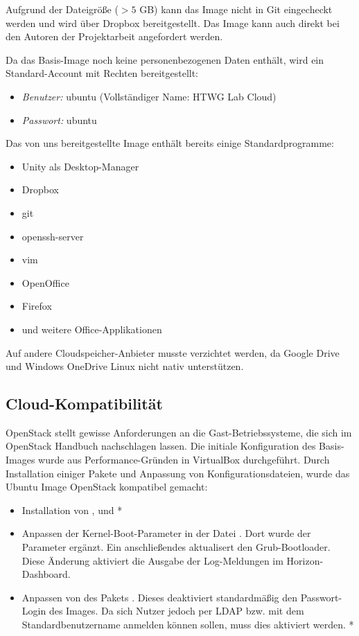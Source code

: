 Aufgrund der Dateigröße ($> 5$ GB) kann das Image nicht in Git eingecheckt werden und wird über Dropbox \cite{dropboxImage} bereitgestellt. Das Image kann auch direkt bei den Autoren der Projektarbeit angefordert werden.

Da das Basis-Image noch keine personenbezogenen Daten enthält, wird ein Standard-Account mit  Rechten bereitgestellt:

\begin{itemize}
\item \emph{Benutzer:} ubuntu (Vollständiger Name: HTWG Lab Cloud)
\item \emph{Passwort:} ubuntu
\end{itemize}

Das von uns bereitgestellte Image enthält bereits einige Standardprogramme:

\begin{itemize}
\item Unity als Desktop-Manager
\item Dropbox
\item git
\item openssh-server
\item vim
\item OpenOffice
\item Firefox
\item und weitere Office-Applikationen
\end{itemize}

Auf andere Cloudspeicher-Anbieter musste verzichtet werden, da Google Drive und Windows OneDrive Linux nicht nativ unterstützen.

\subsection{Cloud-Kompatibilität}

OpenStack stellt gewisse Anforderungen an die Gast-Betriebssysteme, die sich im OpenStack Handbuch \cite{osImageRequirement} nachschlagen lassen. 
Die initiale Konfiguration des Basis-Images wurde aus Performance-Gründen in VirtualBox durchgeführt.
Durch Installation einiger Pakete und Anpassung von Konfigurationsdateien, wurde das Ubuntu Image OpenStack kompatibel gemacht:

\begin{itemize}
\item Installation von ,  und  *
\item Anpassen der Kernel-Boot-Parameter in der Datei . Dort wurde der Parameter  ergänzt. Ein anschließendes  aktualisert den Grub-Bootloader. Diese Änderung aktiviert die Ausgabe der Log-Meldungen im Horizon-Dashboard.
\item Anpassen von  des Pakets . Dieses deaktiviert standardmäßig den Passwort-Login des Images. Da sich Nutzer jedoch per LDAP bzw. mit dem Standardbenutzername anmelden können sollen, muss dies aktiviert werden. *
\end{itemize}

